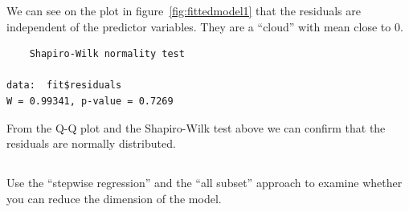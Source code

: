 \documentclass{article}
\begin{document}
We can see on the plot in figure~\ref{fig:fittedmodel1} that the residuals are
independent of the predictor variables. They are a ``cloud'' with mean close to
0.

  \begin{lstlisting}
	Shapiro-Wilk normality test

data:  fit$residuals
W = 0.99341, p-value = 0.7269
  \end{lstlisting}
  
From the Q-Q plot and the Shapiro-Wilk test above we can confirm that the
residuals are normally distributed.

\subsection{}
Use the ``stepwise regression'' and the ``all subset'' approach to examine
whether you can reduce the dimension of the model.
\end{document}
